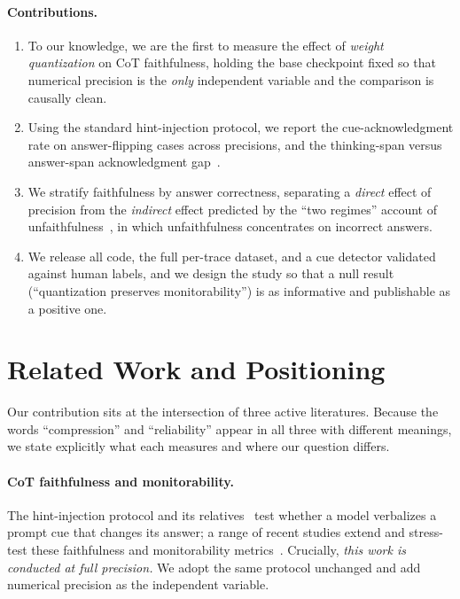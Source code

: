 \documentclass[11pt]{article}
\begin{document}
\paragraph{Contributions.}
\begin{enumerate}
  \item To our knowledge, we are the first to measure the effect of \emph{weight
        quantization} on CoT faithfulness, holding the base checkpoint fixed so
        that numerical precision is the \emph{only} independent variable and the
        comparison is causally clean.
  \item Using the standard hint-injection protocol, we report the
        cue-acknowledgment rate on answer-flipping cases across precisions, and
        the thinking-span versus answer-span acknowledgment
        gap~\cite{whymodelsknow2026}.
  \item We stratify faithfulness by answer correctness, separating a \emph{direct}
        effect of precision from the \emph{indirect} effect predicted by the
        ``two regimes'' account of unfaithfulness~\cite{tworegimes2026}, in which
        unfaithfulness concentrates on incorrect answers.
  \item We release all code, the full per-trace dataset, and a cue detector
        validated against human labels, and we design the study so that a null
        result (``quantization preserves monitorability'') is as informative and
        publishable as a positive one.
\end{enumerate}

\section{Related Work and Positioning}
Our contribution sits at the intersection of three active literatures. Because
the words ``compression'' and ``reliability'' appear in all three with different
meanings, we state explicitly what each measures and where our question differs.

\paragraph{CoT faithfulness and monitorability.}
The hint-injection protocol and its
relatives~\cite{turpin2023,lanham2023} test whether a model verbalizes a prompt
cue that changes its answer; a range of recent studies extend and stress-test
these faithfulness and monitorability
metrics~\cite{anthropic2025reasoning,lietome2026,monitorability2025,faithcotbench2026,bonafide2026}.
Crucially, \emph{this work is conducted at full precision.} We adopt the same
protocol unchanged and add numerical precision as the independent variable.
\end{document}
